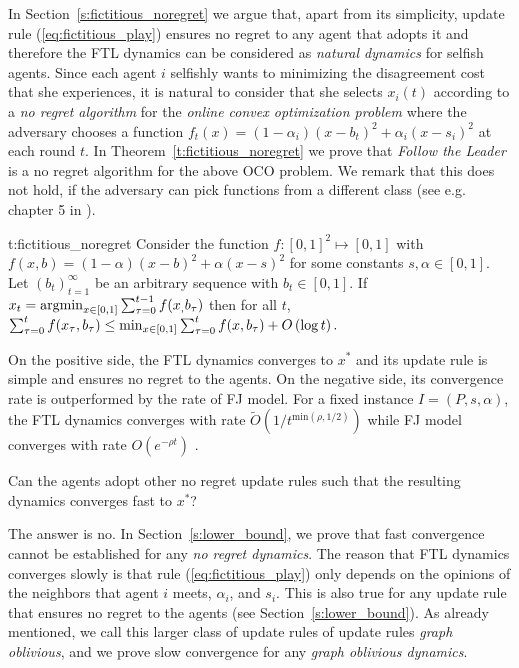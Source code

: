 In Section~\ref{s:fictitious_noregret} we argue that,
apart from its simplicity, update rule (\ref{eq:fictitious_play}) ensures
no regret to any agent that adopts it and therefore the FTL dynamics
can be considered as \emph{natural dynamics} for selfish agents.
Since each agent $i$ selfishly wants to minimizing the disagreement cost
that she experiences, it is natural to consider that she selects $x_i(t)$ according to
a \emph{no regret algorithm} for the \emph{online convex optimization problem}
where the adversary chooses a function $f_t(x)=(1-\alpha_i)(x-b_t)^2 + \alpha_i(x-s_i)^2$
at each round $t$. In Theorem~\ref{t:fictitious_noregret}
we prove that \emph{Follow the Leader} is a no regret algorithm
for the above OCO problem. We remark that this does not hold,
if the adversary can pick functions from a different class
(see e.g. chapter 5 in \cite{Haz16}).

\begin{reptheorem}{t:fictitious_noregret}
  Consider the function $f:[0,1]^2 \mapsto [0,1]$ with
  $f(x,b) = (1-\alpha)(x-b)^2 + \alpha(x-s)^2$ for some
  constants $s,\alpha \in [0,1]$.
  Let $(b_t)_{t=1}^\infty$ be an arbitrary sequence with
  $b_t \in [0,1]$. If $x_t = \operatorname*{argmin}_{x \in [0,1]}\sum_{\tau=0}^{t-1}f(x_,b_\tau)$
  then for all $t$,
  \(
    \sum_{\tau=0}^{t}f(x_\tau,b_\tau) \leq
    \min_{x \in [0,1]}\sum_{\tau=0}^tf(x,b_\tau) + O\left(\log t\right).
  \)
\end{reptheorem}

On the positive side, the FTL dynamics converges to $x^*$ and its
update rule is simple and ensures no regret to the agents.
On the negative side, its convergence rate is outperformed by the rate of FJ
model.  For a fixed instance $I=(P,s,\alpha)$, the FTL dynamics converges with
rate $\widetilde{O}(1/t^{\text{min}(\rho,1/2)})$ while FJ model
converges with rate $O(e^{-\rho t})$ \cite{GS14}.

\begin{question}
  Can the agents adopt other no regret update rules such that the resulting
  dynamics converges fast to $x^*$?
\end{question}

The answer is no. In Section~\ref{s:lower_bound}, we prove that fast convergence cannot be established 
for any \emph{no regret dynamics}.
The reason that FTL dynamics converges slowly is that
 rule (\ref{eq:fictitious_play})
only depends on the opinions of the neighbors that agent $i$ meets,
$\alpha_i$, and $s_i$. This is also true for any update rule that
ensures no regret to the agents (see Section~\ref{s:lower_bound}).
As already mentioned, we call this larger class of update rules
of update rules \emph{graph oblivious}, and we prove slow convergence
for any \emph{graph oblivious dynamics}.

